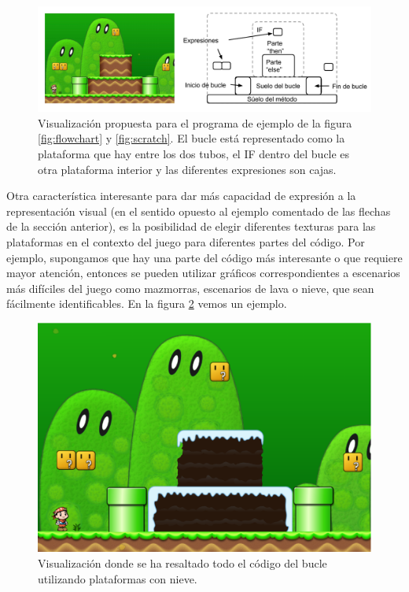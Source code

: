 \documentclass{llncs}
\begin{document}
\begin{figure}[ht]
\begin{center}
\includegraphics[scale=0.5]{images/flowchartgame2.pdf}
\caption{Visualización propuesta para el programa de ejemplo de la figura \ref{fig:flowchart} y \ref{fig:scratch}. El bucle está representado como la plataforma que hay entre los dos tubos, el IF dentro del bucle es otra plataforma interior y las diferentes expresiones son cajas.
\label{fig:flowchartgame}}
\end{center}
\end{figure}

Otra característica interesante para dar más capacidad de expresión a la representación visual (en el sentido opuesto al ejemplo comentado de las flechas de la sección anterior), es la posibilidad de elegir diferentes texturas para las plataformas en el contexto del juego para diferentes partes del código. Por ejemplo, supongamos que hay una parte del código más interesante o que requiere mayor atención, entonces se pueden utilizar gráficos correspondientes a escenarios más difíciles del juego como mazmorras, escenarios de lava o nieve, que sean fácilmente identificables. En la figura \ref{fig:texture} vemos un ejemplo.

\begin{figure}[ht]
\begin{center}
\includegraphics[scale=0.15]{images/texture.eps}
\caption{Visualización donde se ha resaltado todo el código del bucle utilizando plataformas con nieve.
\label{fig:texture}}
\end{center}
\end{figure}
\end{document}
